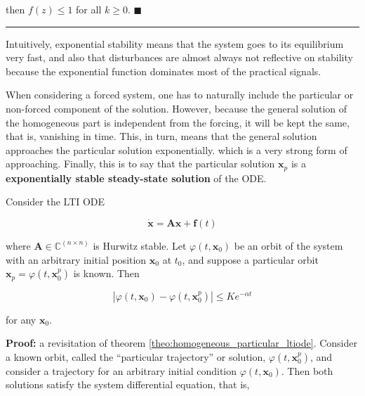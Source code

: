 	\noindent then $f(z) \leq 1$ for all $k\geq 0$.
\hfill$\blacksquare$
\vspace{5mm}
\hrule
\vspace{5mm}

	Intuitively, exponential stability means that the system goes to its equilibrium very fast, and also that disturbances are almost always not reflective on stability because the exponential function dominates most of the practical signals.
	
	When considering a forced system, one has to naturally include the particular or non-forced component of the solution. However, because the general solution of the homogeneous part is independent from the forcing, it will be kept the same, that is, vanishing in time. This, in turn, means that the general solution approaches the particular solution exponentially. which is a very strong form of approaching. Finally, this is to say that the particular solution $\mathbf{x}_p$ is a \textbf{exponentially stable steady-state solution} of the ODE.

\begin{theorem}\label{theorem:stable_sol_lti_systems} %

	Consider the LTI ODE 

\begin{equation} \dot{\mathbf{x}} = \mathbf{Ax} + \mathbf{f}(t) \label{corollary:stable_sol_lti_systems_original_ltiode} \end{equation}

	\noindent where $\mathbf{A}\in\mathbb{C}^{(n\times n)}$ is Hurwitz stable. Let $\varphi\left(t,\mathbf{x}_0\right)$ be an orbit of the system with an arbitrary initial position $\mathbf{x}_0$ at $t_0$, and suppose a particular orbit $\mathbf{x}_p = \varphi\left(t,\mathbf{x}_0^p\right)$ is known. Then 

\begin{equation} \left\lvert \varphi\left(t,\mathbf{x}_0\right) - \varphi\left(t,\mathbf{x}_0^p\right) \right\rvert \leq Ke^{-\alpha t} \end{equation}

	\noindent for any $\mathbf{x}_0$. 
\end{theorem}
\noindent\textbf{Proof:} a revisitation of theorem \ref{theo:homogeneous_particular_ltiode}. Consider a known orbit, called the ``particular trajectory'' or solution, $\varphi\left(t,\mathbf{x}_0^p\right)$, and consider a trajectory for an arbitrary initial condition $\varphi\left(t,\mathbf{x}_0\right)$. Then both solutions satisfy the system differential equation, that is,

